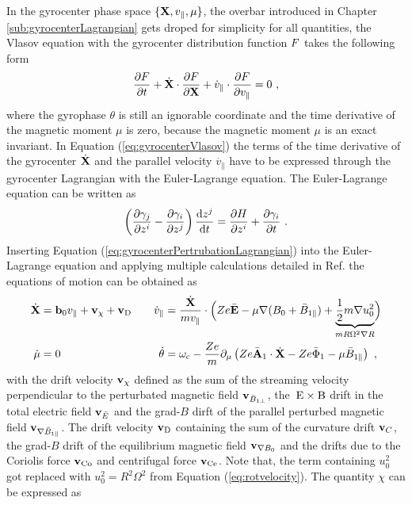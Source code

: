 In the gyrocenter phase space $\{\boldsymbol{\mathbf{X}}, v_\parallel, \mu\}$, the overbar introduced in Chapter \ref{sub:gyrocenterLagrangian} gets droped for simplicity for all quantities, the Vlasov equation with the gyrocenter distribution function $F$ takes the following form
\begin{gather}
	\frac{\partial F}{\partial t} + \dot{\boldsymbol{\mathbf{X}}} \cdot \frac{\partial F}{\partial \boldsymbol{\mathbf{X}}} + \dot{v}_\parallel \cdot \frac{\partial F}{\partial v_\parallel} = 0~,
	\label{eq:gyrocenterVlasov}
\end{gather}
where the gyrophase $\theta$ is still an ignorable coordinate and the time derivative of the magnetic moment $\mu$ is zero, because the magnetic moment $\mu$ is an exact invariant. In Equation (\ref{eq:gyrocenterVlasov}) the terms of the time derivative of the gyrocenter $\dot{\boldsymbol{\mathbf{X}}}$ and the parallel velocity $\dot{v_\parallel}$ have to be expressed through the gyrocenter Lagrangian with the Euler-Lagrange equation. The Euler-Lagrange equation can be written as 
\begin{gather}
	\left(\frac{\partial \gamma_j}{\partial z^i} - \frac{\partial \gamma_i}{\partial z^j}\right) \frac{\mathrm{d}z^j}{\mathrm{d}t} = \frac{\partial H}{\partial z^i} + \frac{\partial \gamma_i}{\partial t}~.
	\label{eq:eulerLagrange}
\end{gather}
Inserting Equation (\ref{eq:gyrocenterPertrubationLagrangian}) into the Euler-Lagrange equation and applying multiple calculations detailed in Ref.  the equations of motion can be obtained as
\begin{gather}
	\begin{aligned}
		\dot{\boldsymbol{\mathbf{X}}} &= \boldsymbol{\mathbf{b}}_0v_\parallel + \boldsymbol{\mathbf{v}}_\chi + \boldsymbol{\mathbf{v}}_\mathrm{D} &\quad \dot{v}_\parallel &= \frac{\dot{\boldsymbol{\mathbf{X}}}}{mv_\parallel} \cdot \Bigl( Ze \bar{\boldsymbol{\mathbf{E}}} -\mu\nabla (B_0 + \bar{B}_{1\parallel}) + \underbrace{\frac{1}{2} m \nabla u_0^2}_{mR \Omega^2 \nabla R} \Bigr) \\
		\dot{\mu} &= 0  &\quad \dot{\theta} &= \omega_\mathrm{c} - \frac{Ze}{m} \partial_\mu \left(Ze\bar{\boldsymbol{\mathbf{A}}}_1 \cdot \dot{\boldsymbol{\mathbf{X}}} - Ze\bar{\Phi}_1 - \mu\bar{B}_{1\parallel}\right)~,
	\end{aligned}
	\label{eq:motionEquation}
\end{gather}
with the drift velocity $\boldsymbol{\mathbf{v}}_\chi$ defined as the sum of the streaming velocity perpendicular to the perturbated magnetic field $\boldsymbol{\mathbf{v}}_{\bar{B}_{1\perp}}$, the $\mathrm{\:E}\times\mathrm{B}$ drift in the total electric field $\boldsymbol{\mathbf{v}}_{\bar{E}}$ and the grad-$B$ dirft of the parallel perturbed magnetic field $\boldsymbol{\mathbf{v}}_{\nabla \bar{B}_{1\parallel}}$. The drift velocity $\boldsymbol{\mathbf{v}}_\mathrm{D}$ containing the sum of the curvature drift $\boldsymbol{\mathbf{v}}_C$, the grad-$B$ drift of the equilibrium magnetic field $\boldsymbol{\mathbf{v}}_{\nabla B_0}$ and the drifts due to the Coriolis force $\boldsymbol{\mathbf{v}}_\mathrm{Co}$ and centrifugal force $\boldsymbol{\mathbf{v}}_\mathrm{Ce}$. Note that, the term containing $u_0^2$ got replaced with $u_0^2 = R^2 \Omega^2$ from Equation (\ref{eq:rotvelocity}). The quantity $\chi$ can be expressed as
